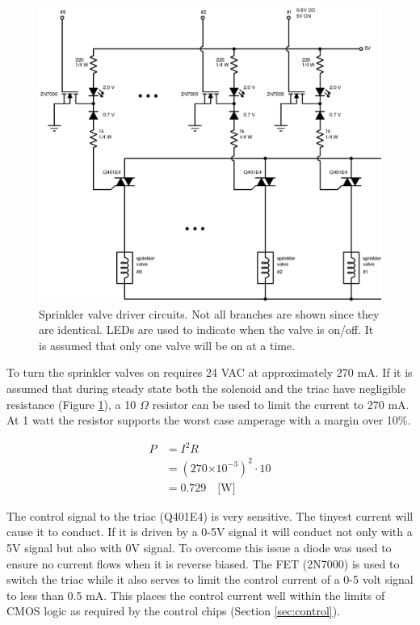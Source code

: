 \documentclass{article}
\providecommand{\e}[1]{\ensuremath{\times 10^{#1}}}
\begin{document}
\begin{figure}[hbp]
\centering
\includegraphics[scale=0.7]{xcircuit/driver_mult}
\caption{Sprinkler valve driver circuits.
Not all branches are shown since they are identical.
LEDs are used to indicate when the valve is on/off.
It is assumed that only one valve will be on at a time.}\label{fig:driver}
\end{figure}

To turn the sprinkler valves on requires 24 VAC at approximately 270 mA.
If it is assumed that during steady state both the solenoid
and the triac have negligible resistance (Figure \ref{fig:driver}),
a 10 $\Omega$ resistor can be used to limit the current to 270 mA.
At 1 watt the resistor supports the worst case amperage with a margin
over 10\%.

\begin{align*}
	P &= I^2 R \\
	  &= (270\e{-3})^2 \cdot 10 \\
	  &= 0.729 \quad \text{[W]}
\end{align*}

The control signal to the triac (Q401E4) is very sensitive.
The tinyest current will cause it to conduct.
If it is driven by a 0-5V signal it will conduct not only
with a 5V signal but also with 0V signal.
To overcome this issue a diode was used to ensure no current
flows when it is reverse biased.
The FET (2N7000) is used to switch the triac while it also
serves to limit the control current of a 0-5 volt signal
to less than 0.5 mA.
This places the control current well within the limits
of CMOS logic as required by the control chips (Section \ref{sec:control}).
\end{document}
